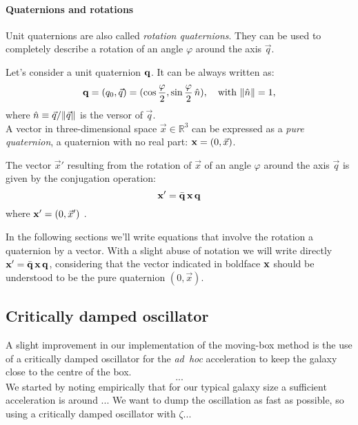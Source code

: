\paragraph{Quaternions and rotations} Unit quaternions are also called \emph{rotation quaternions}.
They can be used to completely describe a rotation of an angle $\varphi$ around the axis $\vec q$.

Let's consider a unit quaternion $\boldsymbol{\mathbf{q}}$. It can be always written as:
\begin{equation}
 \boldsymbol{\mathbf{q}} = (q_0, \vec q) = (\cos \frac \varphi 2, \sin \frac \varphi 2\, \hat n), \quad \text{with } \norm{\hat n}=1,
\end{equation}
where $\hat n \equiv \vec q/\norm{\vec q}$ is the versor of $\vec q$.\\
A vector in three-dimensional space $\vec x \in \mathbb R^3$ can be expressed as a \emph{pure quaternion}, a quaternion with no real part: $\boldsymbol{\mathbf{x}} = (0, \vec x)$.

The vector $\vec x'$ resulting from the rotation of $\vec x$ of an angle $\varphi$ around the axis $\vec q$ is given by the conjugation operation:
\begin{equation}
\boldsymbol{\mathbf{x}}' = \bar{\boldsymbol{\mathbf{q}}}\, \boldsymbol{\mathbf{x}} \, \boldsymbol{\mathbf{q}} 
\end{equation}
where $\boldsymbol{\mathbf{x}}' = (0, \vec x')$ \citep[for a proof, see e.g.][sec. 1.4]{Graf2008}.

In the following sections we'll write equations that involve the rotation a quaternion by a vector.
With a slight abuse of notation we will write directly $\boldsymbol{\mathbf{x}}' = \bar{\boldsymbol{\mathbf{q}}}\, \boldsymbol{\mathbf{x}} \, \boldsymbol{\mathbf{q}}$, considering that the vector indicated in boldface $\boldsymbol{\mathbf{x}}$ should be understood to be the pure quaternion $(0, \vec x)$.%

\subsection{Critically damped oscillator}
A slight improvement in our implementation of the moving-box method is the use of a critically damped oscillator for the \emph{ad~hoc} acceleration to keep the galaxy close to the centre of the box.
\begin{equation}
 ...
\end{equation}
We started by noting empirically that for our typical galaxy size a sufficient acceleration is around ...
We want to dump the oscillation as fast as possible, so using a critically damped oscillator with $\zeta... $

